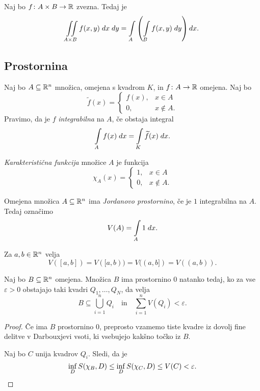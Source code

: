 \begin{posledica}
Naj bo $f \colon A \times B \to \mathbb{R}$ zvezna. Tedaj je
\[
\iint\limits_{A \times B} f(x,y)\;dx\;dy =
\int\limits_A \left(\int\limits_B f(x,y)\;dy\right) dx.
\]
\end{posledica}

\newpage

\subsection{Prostornina}

\begin{definicija}
Naj bo $A \subseteq \mathbb{R}^n$ množica, omejena s kvadrom $K$, in
$f \colon A \to \mathbb{R}$ omejena. Naj bo
\[
\widetilde{f}(x) = \begin{cases}
f(x), &x \in A
\\
0, &x \not \in A.
\end{cases}
\]
Pravimo, da je $f$ \emph{integrabilna} na $A$, če obstaja integral
\[
\int\limits_A f(x)\;dx = \int\limits_K \widetilde{f}(x)\;dx.
\]
\end{definicija}

\begin{definicija}
\emph{Karakteristična funkcija}
množice $A$ je funkcija
\[
\chi_A(x) = \begin{cases}
1, &x \in A
\\
0, &x \not \in A.
\end{cases}
\]
\end{definicija}

\begin{definicija}
Omejena množica $A \subseteq \mathbb{R}^n$ ima
\emph{Jordanovo prostornino}, če je
$1$ integrabilna na $A$. Tedaj označimo
\[
V(A) = \int\limits_A 1\;dx.
\]
\end{definicija}

\begin{opomba}
Za $a, b \in \mathbb{R}^n$ velja
\[
V([a,b]) = V([a,b)) = V((a,b]) = V((a,b)).
\]
\end{opomba}

\begin{trditev}
Naj bo $B \subseteq \mathbb{R}^n$ omejena. Množica $B$ ima prostornino $0$
natanko tedaj, ko za vse $\varepsilon > 0$ obstajajo taki kvadri
$Q_1,\dots,Q_N$, da velja
\[
B \subseteq \bigcup_{i=1}^n Q_i
\quad \text{in} \quad
\sum_{i=1}^n V(Q_i) < \varepsilon.
\]
\end{trditev}

\begin{proof}
Če ima $B$ prostornino $0$, preprosto vzamemo tiste kvadre iz
dovolj fine delitve v Darbouxjevi vsoti, ki vsebujejo kakšno točko
iz $B$.

Naj bo $C$ unija kvadrov $Q_i$. Sledi, da je
\[
\inf_D S(\chi_B,D) \leq
\inf_D S(\chi_C,D) \leq
V(C) < \varepsilon. \qedhere
\]
\end{proof}

